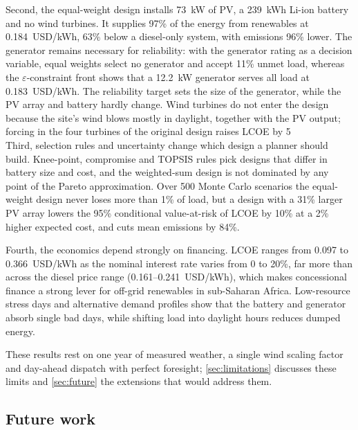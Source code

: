 \documentclass[final,3p,times]{elsarticle}
\begin{document}
Second, the equal-weight design installs 73~kW of PV, a 239~kWh Li-ion battery and no wind turbines. It supplies 97\% of the energy from renewables at 0.184~USD/kWh, 63\% below a diesel-only system, with emissions 96\% lower. The generator remains necessary for reliability: with the generator rating as a decision variable, equal weights select no generator and accept 11\% unmet load, whereas the $\varepsilon$-constraint front shows that a 12.2~kW generator serves all load at 0.183~USD/kWh. The reliability target sets the size of the generator, while the PV array and battery hardly change. Wind turbines do not enter the design because the site's wind blows mostly in daylight, together with the PV output; forcing in the four turbines of the original design raises LCOE by 5\\%

Third, selection rules and uncertainty change which design a planner should build. Knee-point, compromise and TOPSIS rules pick designs that differ in battery size and cost, and the weighted-sum design is not dominated by any point of the Pareto approximation. Over 500 Monte Carlo scenarios the equal-weight design never loses more than 1\% of load, but a design with a 31\% larger PV array lowers the 95\% conditional value-at-risk of LCOE by 10\% at a 2\% higher expected cost, and cuts mean emissions by 84\%.

Fourth, the economics depend strongly on financing. LCOE ranges from 0.097 to 0.366~USD/kWh as the nominal interest rate varies from 0 to 20\%, far more than across the diesel price range (0.161--0.241~USD/kWh), which makes concessional finance a strong lever for off-grid renewables in sub-Saharan Africa. Low-resource stress days and alternative demand profiles show that the battery and generator absorb single bad days, while shifting load into daylight hours reduces dumped energy.

These results rest on one year of measured weather, a single wind scaling factor and day-ahead dispatch with perfect foresight; \cref{sec:limitations} discusses these limits and \cref{sec:future} the extensions that would address them.

\subsection{Future work \label{sec:future}}
\end{document}
